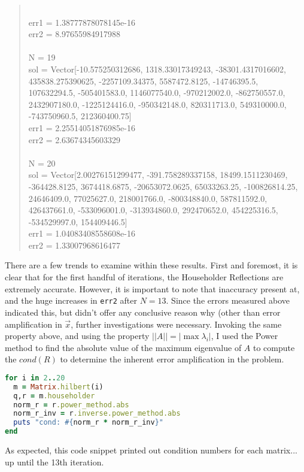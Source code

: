 \documentclass[letterpaper,12pt]{article}
\begin{document}
\begin{quote}
\\err1 = 1.38777878078145e-16
\\err2 = 8.97655984917988
\\
\\N = 19
\\sol = Vector[-10.575250312686, 1318.33017349243, -38301.4317016602, 435838.275390625, -2257109.34375, 5587472.8125, -14746395.5, 107632294.5, -505401583.0, 1146077540.0, -970212002.0, -862750557.0, 2432907180.0, -1225124416.0, -950342148.0, 820311713.0, 549310000.0, -743750960.5, 212360400.75]
\\err1 = 2.25514051876985e-16
\\err2 = 2.63674345603329
\\
\\N = 20
\\sol = Vector[2.00276151299477, -391.758289337158, 18499.1511230469, -364428.8125, 3674418.6875, -20653072.0625, 65033263.25, -100826814.25, 24646409.0, 77025627.0, 218001766.0, -800348840.0, 587811592.0, 426437661.0, -533096001.0, -313934860.0, 292470652.0, 454225316.5, -534529997.0, 154409446.5]
\\err1 = 1.04083408558608e-16
\\err2 = 1.33007968616477
\end{quote}

There are a few trends to examine within these results.
First and foremost, it is clear that for the first handful of iterations, the
Householder Reflections are extremely accurate.
However, it is important to note that inaccuracy present at, and the huge
increases in \texttt{err2} after $N =13$.
Since the errors measured above indicated this, but didn't offer any conclusive
reason why (other than error amplification in $\vec{x}$, further investigations
were necessary.
Invoking the same property above, and using the property $||A|| = |\max{\lambda_i}|$,
I used the Power method to find the absolute value of the maximum eigenvalue of
$A$ to compute the $cond(R)$ to determine the inherent error amplification in the
problem.

\lstset{caption=Determining cond(R)}
\begin{lstlisting}[language=ruby]
for i in 2..20
  m = Matrix.hilbert(i)
  q,r = m.householder
  norm_r = r.power_method.abs
  norm_r_inv = r.inverse.power_method.abs
  puts "cond: #{norm_r * norm_r_inv}"
end
\end{lstlisting}

As expected, this code snippet printed out condition numbers for each matrix...
up until the 13th iteration.
\end{document}
